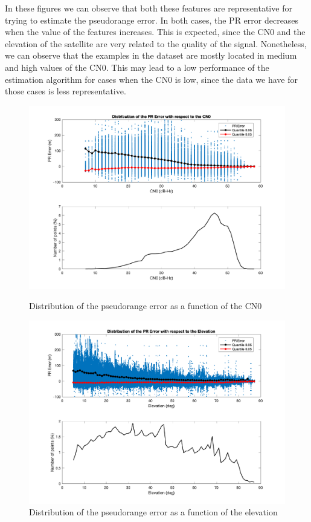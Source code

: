 \documentclass[a4paper, report, oneside, UKenglish]{memoir}
\begin{document}
In these figures we can observe that both these features are representative for trying to estimate the pseudorange error. In both cases, the PR error decreases when the value of the features increases. This is expected, since the CN0 and the elevation of the satellite are very related to the quality of the signal. Nonetheless, we can observe that the examples in the dataset are mostly located in medium and high values of the CN0. This may lead to a low performance of the estimation algorithm for cases when the CN0 is low, since the data we have for those cases is less representative.

\begin{figure}[hb]
  \centering
  \begin{minipage}[b]{0.49\textwidth}
    \includegraphics[width=\textwidth]{data-analysis/pre_cn0.png}
    \caption{Distribution of the pseudorange error as a function of the CN0}
    \label{fig:pre_cn0}
  \end{minipage}
  \hfill
  \begin{minipage}[b]{0.49\textwidth}
    \includegraphics[width=\textwidth]{data-analysis/pre_elev.png}
    \caption{Distribution of the pseudorange error as a function of the elevation}
    \label{fig:pre_elev}
  \end{minipage}
\end{figure}
\end{document}
